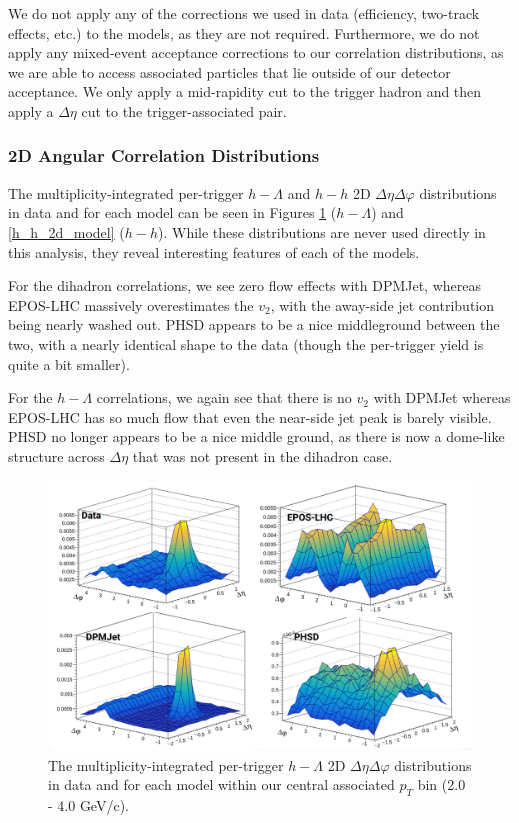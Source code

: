 \documentclass[ALICE,manyauthors]{ALICE_analysis_notes}
\begin{document}
We do not apply any of the corrections we used in data (efficiency, two-track effects, etc.) to the models, as they are not required. Furthermore, we do not apply any mixed-event acceptance corrections to our correlation distributions, as we are able to access associated particles that lie outside of our detector acceptance. We only apply a mid-rapidity cut to the trigger hadron and then apply a $\Delta\eta$ cut to the trigger-associated pair.

\subsubsection{2D Angular Correlation Distributions}
\label{model_2d_correlations}

The multiplicity-integrated per-trigger $h-\Lambda$ and $h-h$ 2D $\Delta\eta\Delta\varphi$ distributions in data and for each model can be seen in Figures \ref{h_lambda_2d_model} ($h-\Lambda$) and \ref{h_h_2d_model} ($h-h$). While these distributions are never used directly in this analysis, they reveal interesting features of each of the models. 

For the dihadron correlations, we see zero flow effects with DPMJet, whereas EPOS-LHC massively overestimates the $v_{2}$, with the away-side jet contribution being nearly washed out. PHSD appears to be a nice middleground between the two, with a nearly identical shape to the data (though the per-trigger yield is quite a bit smaller).

For the $h-\Lambda$ correlations, we again see that there is no $v_{2}$ with DPMJet whereas EPOS-LHC has so much flow that even the near-side jet peak is barely visible. PHSD no longer appears to be a nice middle ground, as there is now a dome-like structure across $\Delta\eta$ that was not present in the dihadron case. 


\begin{figure}[ht]
\centering
\includegraphics[width=5in]{figures/h_lambda_2d_modelcomp.png}
\caption{The multiplicity-integrated per-trigger $h-\Lambda$ 2D $\Delta\eta\Delta\varphi$ distributions in data and for each model within our central associated $p_{T}$ bin (2.0 - 4.0 GeV/c).}
\label{h_lambda_2d_model}
\end{figure}
\end{document}
